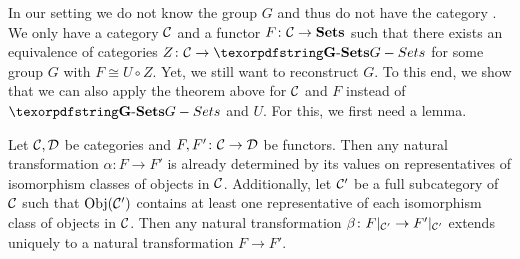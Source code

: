 In our setting we do not know the group $G$ and thus do not have the category \Gset{}. We only have a category $\mathcal{C}$ and a functor $F\colon \mathcal{C} \to {\ensuremath{{\operatorname{\mathbf{Sets}}}}}$ such that there exists an equivalence of categories $Z\colon \Ccal \to \Gset$ for some group $G$ with $F \cong U \circ Z$. Yet, we still want to reconstruct $G$. To this end, we show that we can also apply the theorem above for $\mathcal{C}$ and $F$ instead of $\Gset$ and $U$. For this, we first need a lemma.

\begin{lem}\label{lem:natural_transformation_on_full_subcategory}
Let $\mathcal{C}, \mathcal{D}$ be categories and $F,F' \colon \mathcal{C} \to \mathcal{D}$ be functors. Then any natural transformation $\alpha\colon F \to F'$ is already determined by its values on representatives of isomorphism classes of objects in $\mathcal{C}$. Additionally, let $\mathcal{C}'$ be a full subcategory of $\mathcal{C}$ such that $\operatorname{Obj}(\mathcal{C}')$ contains at least one representative of each isomorphism class of objects in $\mathcal{C}$. Then any natural transformation $\beta\colon F\vert_{\mathcal{C}'} \to F'\vert_{\mathcal{C}'}$ extends uniquely to a natural transformation $F \to F'$.
\end{lem}
